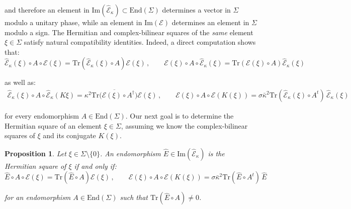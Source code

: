 \documentclass[10pt,a4paper,twoside,reqno]{amsart}
\theoremstyle{plain}
\newtheorem{prop}[thm]{Proposition}
\theoremstyle{definition}
\theoremstyle{remark}
\newcommand{\End}{\mathrm{End}}
\newcommand{\Tr}{\mathrm{Tr}}
\def\cE{\mathcal{E}}
\def\hcE{\widehat{\mathcal{E}}}
\def\Im{\mathrm{Im}}
\begin{document}
\noindent
and therefore an  element in $\Im(\hcE_\kappa) \subset \End(\Sigma)$ determines a vector in $\Sigma$ modulo a unitary phase, while an element in $\Im(\cE)$ determines an element in $\Sigma$ modulo a sign. The Hermitian and complex-bilinear squares of the \emph{same} element $\xi \in \Sigma$ satisfy natural compatibility identities. Indeed, a direct computation shows that: 
\begin{equation}
\label{eq:comp_sq_maps}
\hcE_\kappa(\xi)\circ A \circ \cE(\xi)=\Tr (\hcE_\kappa(\xi) \circ A )\cE(\xi)\, , \qquad \cE(\xi)\circ A \circ \hcE_\kappa(\xi)=\Tr (\cE(\xi)\circ A )\hcE_\kappa(\xi) 
\end{equation}

\noindent
as well as:
\begin{eqnarray}
\label{eq:comp_sq_mapsK}
\hcE_\kappa(\xi)\circ A \circ \hcE_\kappa(K\xi)= \kappa^2 \overline{\Tr\big(\cE(\xi) \circ A^{\dagger}\big)}\cE(\xi)\, , \qquad \cE(\xi) \circ A\circ \cE(K(\xi)) = \sigma \bar{\kappa}^{2} \Tr(\hcE_{\kappa}(\xi) \circ A^{t}) \, \hcE_{\kappa}(\xi)
\end{eqnarray}

\noindent
for every endomorphism $A\in\End(\Sigma)$. Our next goal is to determine the Hermitian square of an element $\xi\in \Sigma$, assuming we know the complex-bilinear squares of $\xi$ and its conjugate $K(\xi)$.

\begin{prop}
\label{prop:endoquadraticbi}
Let $\xi \in \Sigma \setminus \{ 0\}$. An endomorphism $\widehat{E}\in \Im(\hcE_\kappa)$ is the Hermitian square of $\xi$ if and only if:
\begin{equation} 
\label{eq:comp_sq_mapsII}
\widehat{E} \circ A \circ \cE(\xi)  =\Tr (\widehat{E} \circ A) \cE(\xi) \, , \qquad   \cE(\xi) \circ A\circ \cE(K(\xi)) = \sigma \bar{\kappa}^{2}\Tr(\widehat{E} \circ A^{t}) \, \widehat{E}
\end{equation}

\noindent
for an endomorphism $A\in \End(\Sigma)$ such that $\Tr (\widehat{E} \circ A ) \neq 0$.
\end{prop}
 
\end{document}
